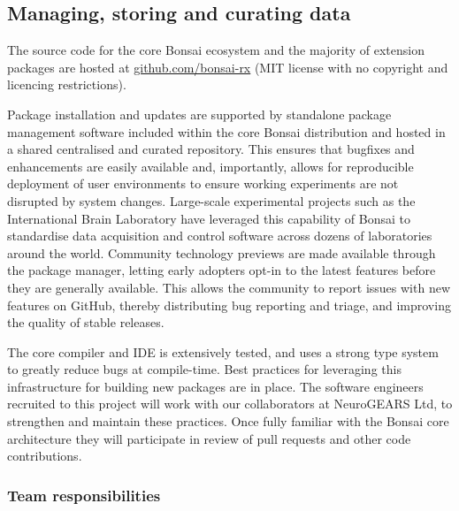 \documentclass[a4paper,11pt]{article}
\begin{document}
\subsection{Managing, storing and curating data}

The source code for the core Bonsai ecosystem and the majority of extension
packages are hosted at \url{github.com/bonsai-rx} (MIT license with no
copyright and licencing restrictions).

Package installation and updates are supported by standalone package management
software included within the core Bonsai distribution and hosted in a shared
centralised and curated repository. This ensures that bugfixes and enhancements
are easily available and, importantly, allows for reproducible deployment of
user environments to ensure working experiments are not disrupted by system
changes.
%
Large-scale experimental projects such as the International Brain Laboratory
have leveraged this capability of Bonsai to standardise data acquisition and
control software across dozens of laboratories around the world.
%
Community technology previews are made available through the package manager,
letting early adopters opt-in to the latest features before they are generally
available. This allows the community to report issues with new features on
GitHub, thereby distributing bug reporting and triage, and improving the
quality of stable releases.

The core compiler and IDE is extensively tested, and uses a strong type system
to greatly reduce bugs at compile-time. Best practices for leveraging this
infrastructure for building new packages are in place. The software engineers
recruited to this project will work with our collaborators at NeuroGEARS Ltd,
to strengthen and maintain these practices. Once fully familiar with the Bonsai
core architecture they will participate in review of pull requests and other
code contributions.

\subsubsection*{Team responsibilities}
\end{document}
